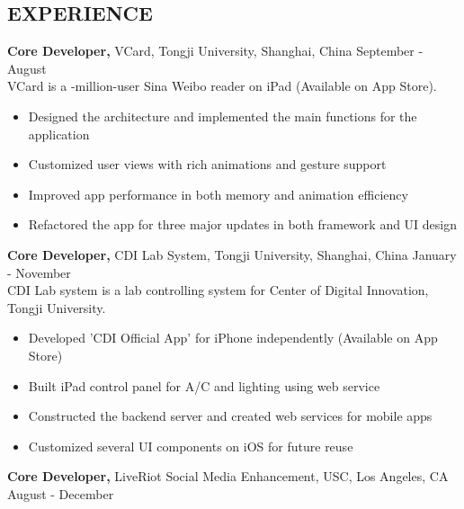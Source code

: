 \documentclass[line, overlapped]{res}
\begin{document}
\begin{resume}
\section{EXPERIENCE}
 {\bf Core Developer,} VCard, Tongji University, Shanghai, China \hfill September  - August \\
 VCard is a -million-user Sina Weibo reader on iPad (Available on App Store).
 \begin{itemize} \itemsep -2pt  %

  \item Designed the architecture and implemented the main functions for the application
 
  \item Customized user views with rich animations and gesture support
 
  \item Improved app performance in both memory and animation efficiency

  \item Refactored the app for three major updates in both framework and UI design
 
 \end{itemize}

{\bf Core Developer,} CDI Lab System, Tongji University, Shanghai, China \hfill  January  - November \\
CDI Lab system is a lab controlling system for Center of Digital Innovation, Tongji University.
\begin{itemize} \itemsep -2pt %
  
  \item Developed 'CDI Official App' for iPhone independently (Available on App Store)
  
  \item Built iPad control panel for A/C and lighting using web service
  
  \item Constructed the backend server and created web services for mobile apps
  
  \item Customized several UI components on iOS for future reuse

\end{itemize}

{\bf Core Developer,} LiveRiot Social Media Enhancement, USC, Los Angeles, CA \hfill  August  - December 
\begin{itemize} \itemsep -2pt %
  

\end{itemize}
\end{resume}
\end{document}
